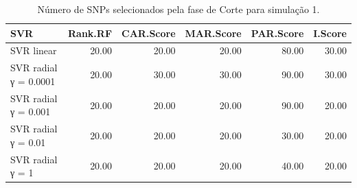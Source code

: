 \begin{table}[ht]
\centering
\begin{tabular}{lrrrrr}
  \hline
SVR & Rank.RF & CAR.Score & MAR.Score & PAR.Score & I.Score \\ 
  \hline
SVR linear & 20.00 & 20.00 & 20.00 & 80.00 & 30.00 \\ 
  SVR radial γ = 0.0001 & 20.00 & 30.00 & 30.00 & 90.00 & 30.00 \\ 
  SVR radial γ = 0.001 & 20.00 & 20.00 & 20.00 & 90.00 & 20.00 \\ 
  SVR radial γ = 0.01 & 20.00 & 20.00 & 20.00 & 30.00 & 20.00 \\ 
  SVR radial γ = 1 & 20.00 & 20.00 & 20.00 & 40.00 & 20.00 \\ 
   \hline
\end{tabular}
\caption{Número de SNPs selecionados pela fase de Corte para simulação 1.} 
\end{table}
